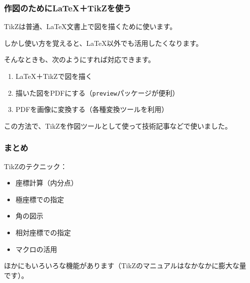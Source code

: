 \documentclass{beamer}
\begin{document}
\begin{frame}
    \frametitle{作図のためにLaTeX＋TikZを使う}

    TikZは普通、LaTeX文書上で図を描くために使います。

    しかし使い方を覚えると、LaTeX以外でも活用したくなります。

    そんなときも、次のようにすれば対応できます。
    \begin{enumerate}
        \item LaTeX＋TikZで図を描く
        \item 描いた図をPDFにする（\texttt{preview}パッケージが便利）
        \item PDFを画像に変換する（各種変換ツールを利用）
    \end{enumerate}

    この方法で、TikZを作図ツールとして使って技術記事などで使いました。
\end{frame}

\begin{frame}
    \frametitle{まとめ}

    TikZのテクニック：

    \begin{itemize}
        \item 座標計算（内分点）
        \item 極座標での指定
        \item 角の図示
        \item 相対座標での指定
        \item マクロの活用
    \end{itemize}

    ほかにもいろいろな機能があります（TikZのマニュアルはなかなかに膨大な量です）。
\end{frame}
\end{document}
